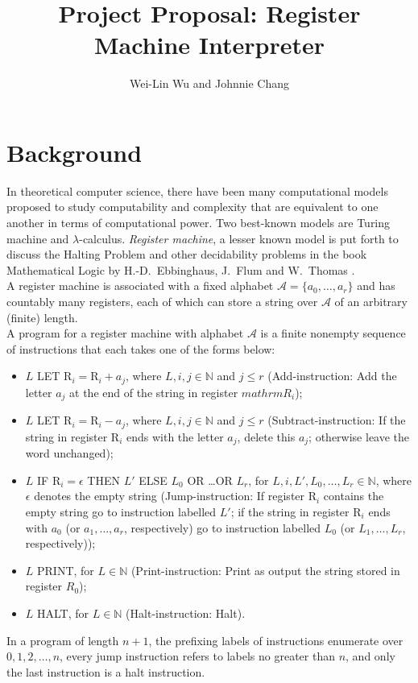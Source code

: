 \documentclass[english]{article}
\begin{document}
\title{Project Proposal: Register Machine Interpreter}

\author{Wei-Lin Wu and Johnnie Chang}

\maketitle
\thispagestyle{fancy}


\section{Background}
In theoretical computer science, there have been many computational models proposed 
to study computability and complexity that are equivalent to one another in terms of computational power. 
Two best-known models are Turing machine and $\lambda$-calculus. 
\emph{Register machine}, a lesser known model is put forth to discuss the Halting Problem 
and other decidability problems in the book Mathematical Logic by H.-D.\ Ebbinghaus, J.\ Flum and W.\ Thomas \cite{ebbinghaus2013mathematical}.
\medskip\\
A register machine is associated with a fixed alphabet $\mathcal{A} = \{a_0, \ldots, a_r\}$ and has countably many registers, 
each of which can store a string over $\mathcal{A}$ of an arbitrary (finite) length.
\medskip\\
A program for a register machine with alphabet $\mathcal{A}$ is a finite nonempty sequence of instructions that each takes one of the forms below:
\begin{itemize}
\item $L$ LET $\mathrm{R}_i = \mathrm{R}_i + a_j$, where $L, i, j \in \mathbb{N}$ and $j \leq r$ (Add-instruction: Add the letter $a_j$ at the end of the string in register $mathrm{R}_i$);
\item $L$ LET $\mathrm{R}_i = \mathrm{R}_i - a_j$, where $L, i, j \in \mathbb{N}$ and $j \leq r$ (Subtract-instruction: If the string in register $\mathrm{R}_i$ ends with the letter $a_j$, delete this $a_j$; otherwise leave the word unchanged);
\item $L$ IF $\mathrm{R}_i = \epsilon$ THEN $L'$ ELSE $L_0$ OR \ldots OR $L_r$, for $L, i, L', L_0, \ldots , L_r \in \mathbb{N}$, where $\epsilon$ denotes the empty string (Jump-instruction: If register $\mathrm{R}_i$ contains the empty string go to instruction labelled $L'$; if the string in register $\mathrm{R}_i$ ends with $a_0$ (or $a_1, \ldots, a_r$, respectively) go to instruction labelled $L_0$ (or $L_1, \ldots, L_r$, respectively));
\item $L$ PRINT, for $L \in \mathbb{N}$ (Print-instruction: Print as output the string stored in register
$R_0$);
\item $L$ HALT, for $L \in \mathbb{N}$ (Halt-instruction: Halt).
\end{itemize}
In a program of length $n + 1$, the prefixing labels of instructions enumerate over $0, 1, 2, \ldots, n$, 
every jump instruction refers to labels no greater than $n$, and only the last instruction is a halt instruction.
\end{document}
